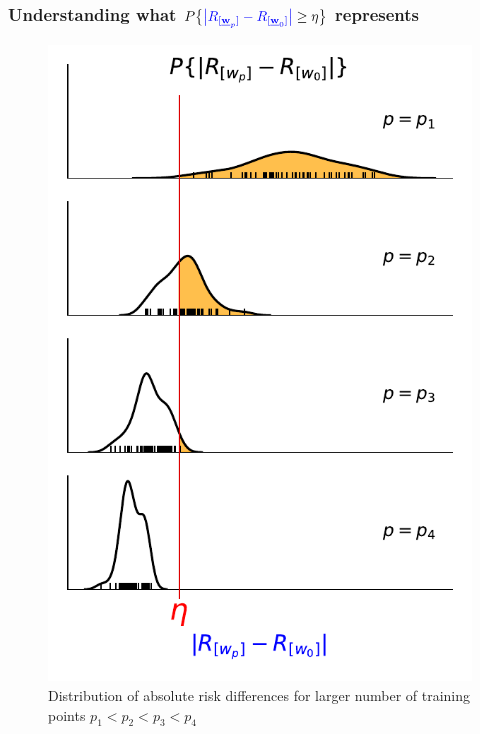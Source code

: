 \begin{frame}
\label{sec:convergence_erm}
\frametitle{ Understanding what $P\big\{ 
	{\color{question1}
		\big|R_{[\vec w_p]} - R_{[\vec w_0]}\big| 
	} \geq \eta \big\}$ represents
}

\begin{figure}
	\includegraphics[height=\slidesonly{6.7cm}{\notesonly{8cm}}]{img/PdeltaReta}
	\caption{Distribution of absolute risk differences for larger number of training points $p_{1} < p_{2} < p_{3} < p_{4}$}
	\label{fig:PdeltaReta}
\end{figure}
	

\end{frame}
